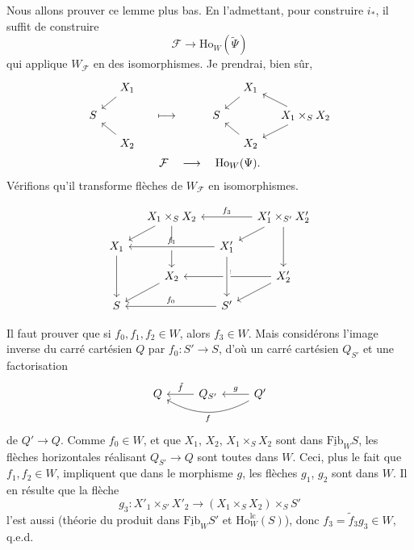 \documentclass[11pt]{article}
\newcommand{\msp}[1]{\marginpar{\footnotesize [#1]}}
\newcommand{\Ho}{\mathrm{Ho}}
\newcommand{\lc}{\mathrm{lc}}
\newcommand{\uFib}{\underline{\mathrm{Fib}}}
\begin{document}
Nous allons prouver ce lemme plus bas. En l'admettant, pour construire $i_*$, il suffit de construire
\[
\mathcal{F}\longrightarrow\Ho_W(\tilde{\Psi})
\]
qui applique $W_{\mathcal{F}}$ en des isomorphismes. Je prendrai, bien sûr,
\[
\begin{gathered}
\begin{tikzcd}[ampersand replacement=\&, row sep=small, column sep=small]
 \& X_1 \arrow[dl] \& \& \& \& X_1 \arrow[dl] \& \\
S \& \& \longmapsto \& \& S \& \& X_1\times_S X_2 \arrow[ul] \arrow[dl] \\
 \& X_2 \arrow[ul] \& \& \& \& X_2 \arrow[ul] \&
\end{tikzcd}\\
\mathcal{F}\quad\longrightarrow\quad\Ho_W(\Psi).
\end{gathered}
\] %
Vérifions qu'il transforme flèches de $W_{\mathcal{F}}$ en isomorphismes.

\msp{page 250}

\[
\begin{tikzcd}[ampersand replacement=\&, row sep=small, column sep=small]
 \& X_1\times_S X_2 \arrow[dl] \arrow[dd] \& \& X'_1\times_{S'}X'_2 \arrow[ll, "f_3"'] \arrow[dl] \arrow[dd] \\
X_1 \arrow[dd] \& \& X'_1 \arrow[ll, crossing over, "f_1"'] \& \\
 \& X_2 \arrow[dl] \& \& X'_2 \arrow[ll, "f_2"'] \arrow[dl] \\
S \& \& S' \arrow[ll, "f_0"'] \arrow[from=uu, crossing over] \&
\end{tikzcd}
\]

Il faut prouver que si $f_0,f_1,f_2\in W$, alors $f_3\in W$. Mais considérons l'image inverse du carré cartésien $Q$ par $f_0 : S'\longrightarrow S$, d'où un carré cartésien $Q_{S'}$ et une factorisation
\[
\begin{tikzcd}[ampersand replacement=\&]
Q \& Q_{S'} \arrow[l, "\tilde{f}"'] \& Q' \arrow[l, "g"'] \arrow[ll, bend left, "f"]
\end{tikzcd}
\]
de $Q'\longrightarrow Q$. Comme $f_0\in W$, et que $X_1$, $X_2$, $X_1\times_S X_2$ sont dans $\uFib_W S$, les flèches horizontales réalisant $Q_{S'}\longrightarrow Q$ sont toutes dans $W$. Ceci, plus le fait que $f_1,f_2\in W$, impliquent que dans le morphisme $g$, les flèches $g_1$, $g_2$ sont dans $W$. Il en résulte que la flèche
\[
g_3 : X'_1\times_{S'}X'_2\longrightarrow(X_1\times_S X_2)\times_S S'
\]
l'est aussi (théorie du produit dans $\uFib_W S'$ et $\Ho^{\lc}_W(S)$), donc $f_3=\tilde{f}_3g_3\in W$, q.e.d.
\end{document}
